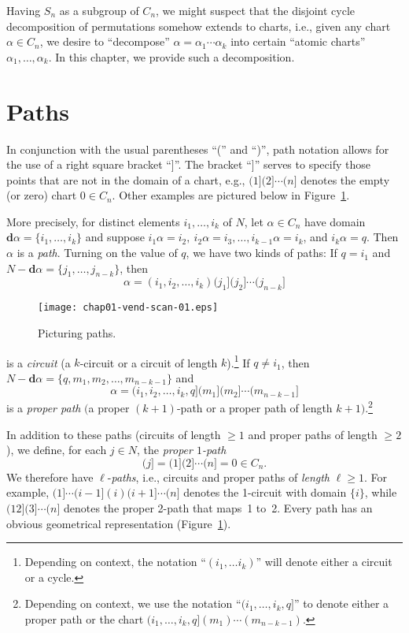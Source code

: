 \documentclass{surv-l}
\numberwithin{equation}{section}
\numberwithin{table}{section}
\numberwithin{figure}{section}
\theoremstyle{definition}
\begin{document}
Having $S_{n}$ as a subgroup of $C_{n}$, we might suspect that the
disjoint cycle decomposition of permutations somehow extends to
charts, i.e., given any chart $\alpha\in C_{n}$, we desire to
``decompose'' $\alpha=\alpha_{1}\cdots\alpha_{k}$ into certain
``atomic charts'' $\alpha_{1},\ldots,\alpha_{k}$. In this chapter,
we provide such a decomposition.

\section{Paths}\label{sec1.1}

In conjunction with the usual parentheses ``('' and ``)'', path
notation allows for the use of a right square bracket ``]''. The
bracket ``]'' serves to specify those points that are not in the
domain of a chart, e.g., $(1](2]\cdots(n]$ denotes the empty (or
zero) chart $0\in C_{n}$. Other examples are pictured below in
Figure~\ref{fig1.1.1}.

More precisely, for distinct elements $i_{1},\ldots, i_{k}$ of
$N$, let $\alpha\in C_{n}$ have domain
$\mathbf{d}\alpha=\{i_{1},\ldots,i_{k}\}$ and suppose
$i_{1}\alpha=i_{2},\ i_{2}\alpha=i_{3},\ldots,
i_{k-1}\alpha=i_{k}$, and $i_{k}\alpha=q$. Then $\alpha$ is a
\emph{path}. Turning on the value of $q$, we have two kinds of
paths: If $q=i_{1}$ and $N-\mathbf{d}\alpha=\{j_{1},\ldots,
j_{n-k}\}$, then
\[
\alpha=(i_{1},i_{2},\ldots, i_{k})(j_{1}](j_{2}]\cdots(j_{n-k}]
\]

\begin{figure}[!h]
\texttt{[image: chap01-vend-scan-01.eps]}
\caption{Picturing paths.\label{fig1.1.1}}
\end{figure}

\noindent is a \emph{circuit} (a
$k$-circuit or a circuit of
length $k$).\footnote{Depending on
context, the notation ``$(i_{1},\ldots i_{k})$'' will denote either a
circuit or a cycle.} If $q\neq i_{1}$, then $N-\mathbf{d}\alpha=
\{q,m_{1}, m_{2},\ldots, m_{n-k-1}\}$ and
\[
\alpha=(i_{1},i_{2},\ldots,i_{k},q](m_{1}](m_{2}]\cdots(m_{n-k-1}]
\]
is a \emph{proper path} $($a proper
$(k+1)$-path or a proper path of length $k+1)$.\footnote{Depending
on context, we use the notation ``$(i_{1},\ldots, i_{k},q]$'' to
denote either a proper path or the chart $(i_{1},\ldots,
i_{k},q](m_{1})\cdots(m_{n-k-1})$.}

In addition to these paths (circuits of length $\geq 1$ and proper
paths of length $\geq 2$), we define, for each $j\in N$, the
\emph{proper $1$-path}
\[
(j]=(1](2]\cdots(n]=0\in C_{n}.
\]
We therefore have $\ell$-\emph{paths}, i.e., circuits and proper
paths of \emph{length}
$\ell\geq 1$. For example, $(1]\cdots (i-1](i)(i+1]\cdots(n]$
denotes the 1-circuit with domain $\{i\}$, while
$(12](3]\cdots(n]$ denotes the proper 2-path that maps~1 to~2.
Every path has an obvious geometrical representation
(Figure~\ref{fig1.1.1}).
\end{document}
